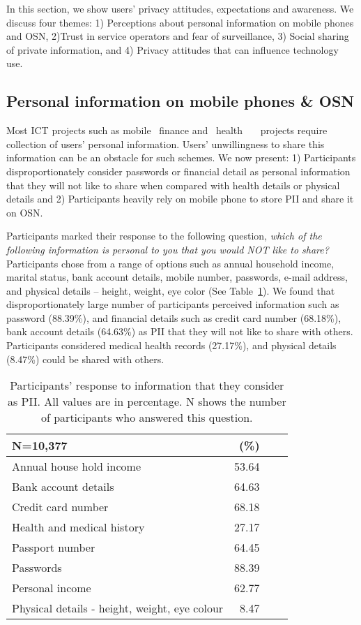 In this section, we show users' privacy attitudes, expectations and awareness. We discuss four themes: 1) Perceptions about personal information on mobile phones and OSN, 2)Trust in service operators and fear of surveillance, 3) Social sharing of private information, and 4) Privacy attitudes that can influence technology use.

\subsection{Personal information on mobile phones \& OSN}
Most ICT projects such as mobile ~finance and ~health ~~~projects require collection of users' personal information. Users' unwillingness to share this information can be an obstacle for such schemes. We now present: 1) Participants disproportionately consider passwords or financial detail as personal information that they will not like to share when compared with health details or physical details and 2) Participants heavily rely on mobile phone to store PII and share it on OSN.

Participants marked their response to the following question, \emph{ which of the following information is personal to you that you would NOT like to share?} Participants chose from a range of options such as annual household income, marital status, bank account details, mobile number, passwords, e-mail address, and physical details -- height, weight, eye color (See Table~\ref{tab:PIIwhat}). We found that disproportionately large number of participants perceived information such as password (88.39\%), and financial details such as credit card number (68.18\%), bank account details (64.63\%) as PII  that they will not like to share with others. Participants considered medical health records (27.17\%), and physical details (8.47\%) could be  shared with others. 

\begin{table}[!htbp]
\caption{\small{Participants' response to information that they consider as PII. All values are in percentage. N shows the number of participants who answered this question.}}
\small
\centering
\setlength{\extrarowheight}{2pt}
\begin{tabular}{p{6cm} r p{1.4cm} r}
\midrule
\textbf{N=10,377}&\textbf{(\%)}\\
\midrule
 \rowcolor {gray!16 }
\raggedright Annual house hold income &53.64\\
\raggedright Bank account details & 64.63\\
 \rowcolor {gray!16 }
\raggedright Credit card number & 68.18\\
\raggedright Health and medical history &27.17\\
 \rowcolor {gray!16 }
\raggedright Passport number& 64.45\\
\raggedright Passwords &88.39\\
 \rowcolor {gray!16 }
\raggedright Personal income &62.77\\
\raggedright Physical details - height, weight, eye colour & 8.47\\
\midrule
\hline
\end{tabular}
\label{tab:PIIwhat}
\end{table} 

